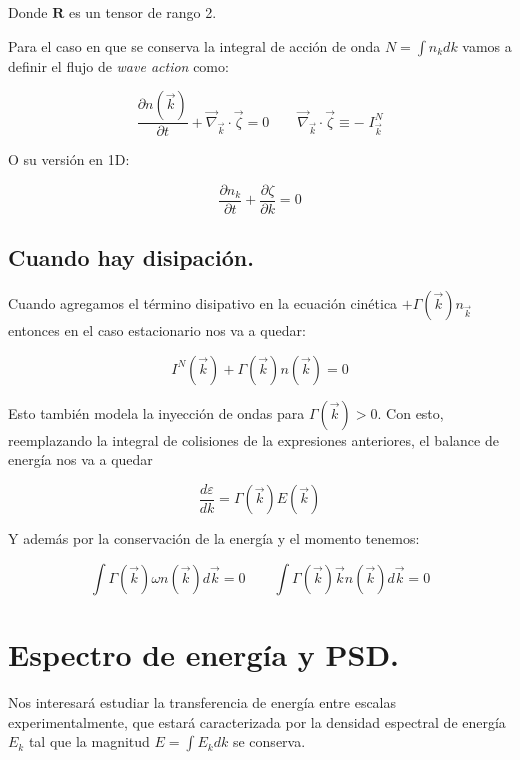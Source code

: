 Donde $\mathbf{R}$ es un tensor de rango 2.

Para el caso en que se conserva la integral de acción de onda $N=\int n_k dk$ vamos a definir el flujo de \textit{wave action} como:

\begin{equation}
	\frac{\partial n(\vec k)}{\partial t} + \vec\nabla_{\vec k} \cdot \vec \zeta = 0  \qquad \vec\nabla_{\vec k} \cdot \vec \zeta \equiv - \;I_{\vec k}^N
\end{equation}

O su versión en 1D:

\begin{equation}
	\frac{\partial n_k}{\partial t} + \frac{\partial \zeta}{\partial k} = 0
\end{equation}


\subsection*{Cuando hay disipación.}
Cuando agregamos el término disipativo en la ecuación cinética $+\Gamma({\vec k})n_{\vec k}$ entonces en el caso estacionario nos va a quedar:

\begin{equation}
	I^N(\vec k) + \Gamma(\vec k)n(\vec k) = 0
\end{equation}

Esto también modela la inyección de ondas para $\Gamma(\vec k)>0$. Con esto, reemplazando la integral de colisiones de la expresiones anteriores, el balance de energía nos va a quedar 

\begin{equation}
	\frac{d\varepsilon}{dk} = \Gamma(\vec k)E(\vec k)
\end{equation}

Y además por la conservación de la energía y el momento tenemos:

\begin{equation}
	\int \Gamma(\vec k) \omega n(\vec k)d\vec k = 0 \qquad \int \Gamma(\vec k) \vec k n(\vec k)d\vec k = 0
\end{equation}

\section{Espectro de energía y PSD.}
Nos interesará estudiar la transferencia de energía entre escalas experimentalmente, que estará caracterizada por la densidad espectral de energía $E_k$ tal que la magnitud $E = \int E_k dk$ se conserva. 

